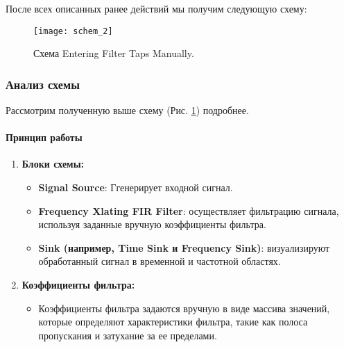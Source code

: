 \documentclass[a4paper,12pt]{extarticle}
\begin{document}
\vspace{0.25cm}После всех описанных ранее действий мы получим следующую схему:\\
\begin{figure}[H]
    \centering
    \texttt{[image: schem\_2]}
    \caption{Схема Entering Filter Taps Manually.} %
    \label{fig:schem_2} %
\end{figure}

\subsubsection{Анализ схемы}

Рассмотрим полученную выше схему (Рис. \ref{fig:schem_2}) подробнее.

\paragraph{Принцип работы}

\begin{enumerate}
    \item \textbf{Блоки схемы:}
    \begin{itemize}
        \item \textbf{Signal Source}: Ггенерирует входной сигнал.
        \item \textbf{Frequency Xlating FIR Filter}: осуществляет фильтрацию сигнала, используя заданные вручную коэффициенты фильтра.
        \item \textbf{Sink (например, Time Sink и Frequency Sink)}: визуализируют обработанный сигнал в временной и частотной областях.
    \end{itemize}
    \item \textbf{Коэффициенты фильтра:}
    \begin{itemize}
        \item Коэффициенты фильтра задаются вручную в виде массива значений, 
        которые определяют характеристики фильтра, такие как полоса пропускания и 
        затухание за ее пределами.
    \end{itemize}
\end{enumerate}
\end{document}
